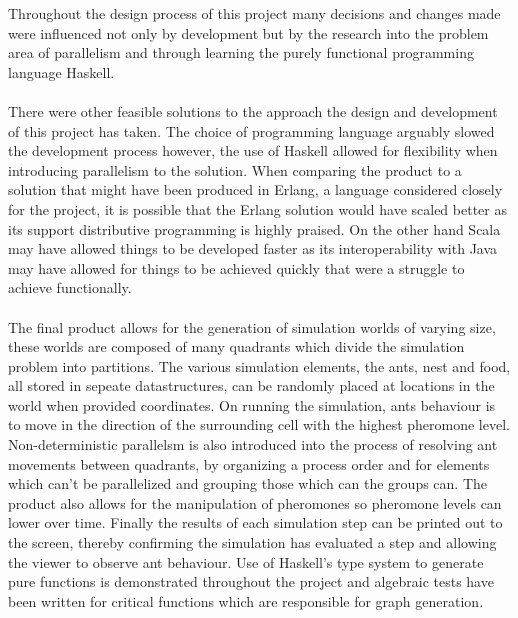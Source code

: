\documentclass[main.tex]{subfiles}
\begin{document}
Throughout the design process of this project many decisions and changes made were influenced not only by development but by the research into the problem area of parallelism and through learning the purely functional programming language Haskell.  %


\paragraph{}There were other feasible solutions to the approach the design and development of this project has taken. The choice of programming language arguably slowed the development process however, the use of Haskell allowed for flexibility when introducing parallelism to the solution. When comparing the product to a solution that might have been produced in Erlang, a language considered closely for the project, it is possible that the Erlang solution would have scaled better as its support distributive programming is highly praised. On the other hand Scala may have allowed things to be developed faster as its interoperability with Java may have allowed for things to be achieved quickly that were a struggle to achieve functionally.

\paragraph{}The final product allows for the generation of simulation worlds of varying size, these worlds are composed of many quadrants which divide the simulation problem into partitions. The various simulation elements, the ants, nest and food, all stored in sepeate datastructures, can be randomly placed at locations in the world when provided coordinates. On running the simulation, ants behaviour is to move in the direction of the surrounding cell with the highest pheromone level. Non-deterministic parallelsm is also introduced into the process of resolving ant movements between quadrants, by organizing a process order and for elements which can't be parallelized and grouping those which can the groups can. The product also allows for the manipulation of pheromones so pheromone levels can lower over time. Finally the results of each simulation step can be printed out to the screen, thereby confirming the simulation has evaluated a step and allowing the viewer to observe ant behaviour. Use of Haskell's type system to generate pure functions is demonstrated throughout the project and algebraic tests have been written for critical functions which are responsible for graph generation.
\end{document}
